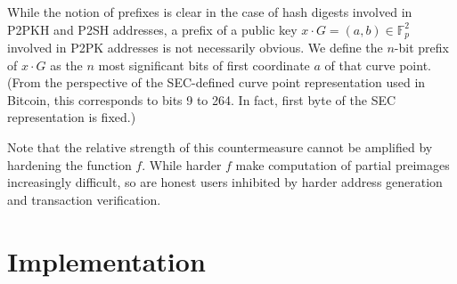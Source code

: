 \documentclass[a4paper,11pt,titlepage]{scrbook}
\begin{document}
While the notion of prefixes is clear in the case of hash digests involved in P2PKH and P2SH addresses, a prefix of a public key $x\cdot G = (a,b) \in \mathbb{F}_p^2$ involved in P2PK addresses is not necessarily obvious.
We define the $n$-bit prefix of $x\cdot G$ as the $n$ most significant bits of first coordinate $a$ of that curve point. 
(From the perspective of the SEC-defined curve point representation used in Bitcoin, this corresponds to bits 9 to 264. In fact, first byte of the SEC representation is fixed.)

Note that the relative strength of this countermeasure cannot be amplified by hardening the function $f$.
While harder $f$ make computation of partial preimages increasingly difficult, so are honest users inhibited by harder address generation and transaction verification.

\section{Implementation}
\end{document}
